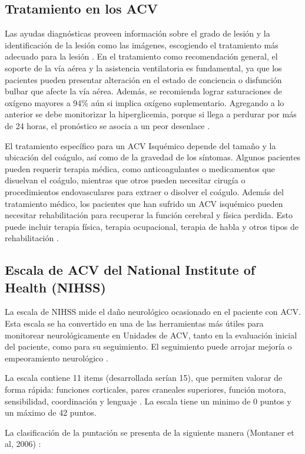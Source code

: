 \subsection{Tratamiento en los ACV}
Las ayudas diagnósticas proveen información sobre el grado de lesión y la identificación de la lesión  como las imágenes, escogiendo el tratamiento más adecuado para la lesión \cite{Wintermark2013}. En el tratamiento como recomendación general, el soporte de la vía aérea y la asistencia ventilatoria es fundamental, ya que los pacientes pueden presentar alteración en el estado de conciencia o disfunción bulbar que afecte la vía aérea. Además, se recomienda lograr saturaciones de oxígeno mayores a 94\% aún si implica oxígeno suplementario. Agregando a lo anterior se debe monitorizar la hiperglicemia, porque si llega a perdurar por más de 24 horas, el pronóstico se asocia a un peor desenlace \cite{Garcia2019}.\\
\par El tratamiento específico para un ACV Isquémico depende del tamaño y la ubicación del coágulo, así como de la gravedad de los síntomas. Algunos pacientes pueden requerir terapia médica, como anticoagulantes o medicamentos que disuelvan el coágulo, mientras que otros pueden necesitar cirugía o procedimientos endovasculares para extraer o disolver el coágulo. Además del tratamiento médico, los pacientes que han sufrido un ACV isquémico pueden necesitar rehabilitación para recuperar la función cerebral y física perdida. Esto puede incluir terapia física, terapia ocupacional, terapia de habla y otros tipos de rehabilitación \cite{Garcia2019}.\\


\doublespacing
\subsection{Escala de ACV del National Institute of Health (NIHSS)} 
\label{sec:NIHSS}
La escala de NIHSS mide el daño neurológico ocasionado en el paciente con ACV. Esta escala se ha convertido en una de las herramientas más útiles para monitorear neurológicamente en Unidades de ACV, tanto en la evaluación inicial del paciente, como para su seguimiento. El seguimiento puede arrojar mejoría o empeoramiento neurológico \cite{cien2001}. \\
\par La escala contiene 11 items (desarrollada serían 15), que permiten valorar de forma rápida: funciones corticales, pares craneales superiores, función motora, sensibilidad, coordinación y lenguaje \cite{cien2001}. La escala tiene un minimo de 0 puntos y un máximo de 42 puntos.\\
\par La clasificación de la puntación se presenta de la siguiente manera (Montaner et al, 2006) \cite{montaner2006escala}:

